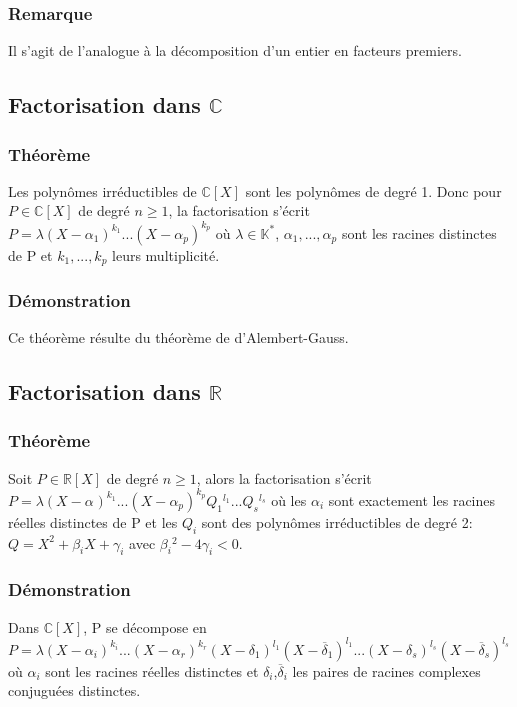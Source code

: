 \documentclass[a4paper,10pt]{book} %
\newcommand{\R}{\mathbb{R}}
\newcommand{\C}{\mathbb{C}}
\newcommand{\K}{\mathbb{K}}
\begin{document}
\subsubsection{Remarque}
Il s'agit de l'analogue à la décomposition d'un entier en facteurs premiers.

\subsection{Factorisation dans $\C$}
\subsubsection{Théorème}
Les polynômes irréductibles de $\C[X]$ sont les polynômes de degré 1. Donc pour $P\in \C[X]$ de degré $n\geq 1$, la factorisation s'écrit $P=\lambda (X-\alpha_{1})^{k_{1}}...(X-\alpha_{p})^{k_{p}}$ où $\lambda\in \K^{*}$, $\alpha_{1},...,\alpha_{p}$ sont les racines distinctes de P et $k_{1},...,k_{p}$ leurs multiplicité.

\subsubsection{Démonstration}
Ce théorème résulte du théorème de d'Alembert-Gauss.

\subsection{Factorisation dans $\R$}
\subsubsection{Théorème}
Soit $P\in \R[X]$ de degré $n\geq 1$, alors la factorisation s'écrit $P=\lambda(X-\alpha_{})^{k_{1}}...(X-\alpha_{p})^{k_{p}}Q_{1}{}^{l_{1}}...Q_{s}{}^{l_{s}}$
où les $\alpha_{i}$ sont exactement les racines réelles distinctes de P et les $Q_{i}$ sont des polynômes irréductibles de degré 2: $Q=X^{2}+\beta_{i}X+\gamma_{i}$ avec $\beta_{i}{}^{2}-4\gamma_{i}<0$.

\subsubsection{Démonstration}
Dans $\C[X]$, P se décompose en
$P=\lambda (X-\alpha_{i})^{k_{i}}...(X-\alpha_{r})^{k_{r}}(X-\delta_{1})^{l_{1}}(X-\overline{\delta}_{1})^{l_{1}}... (X-\delta_{s})^{l_{s}}(X-\overline{\delta}_{s})^{l_{s}}$
où $\alpha_{i}$ sont les racines réelles distinctes et $\delta_{i}$,$\overline{\delta}_{i}$ les paires de racines complexes conjuguées distinctes.
\end{document}
